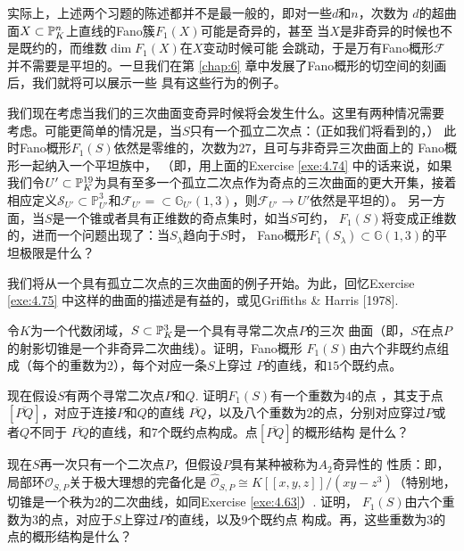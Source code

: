 实际上，上述两个习题的陈述都并不是最一般的，即对一些$d$和$n$，次数为
$d$的超曲面$X\subset \P_K^n$上直线的Fano簇$F_1(X)$可能是奇异的，甚至
当$X$是非奇异的时候也不是既约的，而维数$\dim F_1(X)$在$X$变动时候可能
会跳动，于是万有Fano概形$\mathscr F$并不需要是平坦的。一旦我们在第 
\ref{chap:6} 章中发展了Fano概形的切空间的刻画后，我们就将可以展示一些
具有这些行为的例子。

我们现在考虑当我们的三次曲面变奇异时候将会发生什么。这里有两种情况需要
考虑。可能更简单的情况是，当$S$只有一个孤立二次点：（正如我们将看到的，）
此时Fano概形$F_1(S)$依然是零维的，次数为$27$，且可与非奇异三次曲面上的
Fano概形一起纳入一个平坦族中，
（即，用上面的Exercise \ref{exe:4.74} 中的话来说，如果我们令$U'\subset 
\P_K^{19}$为具有至多一个孤立二次点作为奇点的三次曲面的更大开集，接着
相应定义$\mathscr{S}_{U'}\subset \mathbb{P}_{U'}^{3}$和$\mathscr{F}_{U'}=
\subset \mathbb{G}_{U'}(1,3)$，则$\mathscr{F}_{U'}\to U'$依然是平坦的）。
另一方面，当$S$是一个锥或者具有正维数的奇点集时，如当$S$可约，
$F_1(S)$将变成正维数的，进而一个问题出现了：当$S_\lambda$趋向于$S$时，
Fano概形$F_1(S_\lambda)\subset \mathbb G(1,3)$的平坦极限是什么？

我们将从一个具有孤立二次点的三次曲面的例子开始。为此，回忆Exercise 
\ref{exe:4.75} 中这样的曲面的描述是有益的，或见Griffiths \& Harris 
[1978].

\begin{exe}\label{exe:4.75}
令$K$为一个代数闭域，$S\subset \P_K^3$是一个具有寻常二次点$P$的三次
曲面（即，$S$在点$P$的射影切锥是一个非奇异二次曲线）。证明，Fano概形
$F_1(S)$由六个非既约点组成（每个的重数为$2$），每个对应一条$S$上穿过
$P$的直线，和$15$个既约点。
\end{exe}


\begin{exe}\label{exe:4.76}
现在假设$S$有两个寻常二次点$P$和$Q$. 证明$F_1(S)$有一个重数为$4$的点
，其支于点$[\overline{PQ}]$，对应于连接$P$和$Q$的直线
$\overline{PQ}$，以及八个重数为$2$的点，分别对应穿过$P$或者$Q$不同于
$\overline{PQ}$的直线，和$7$个既约点构成。点$[\overline{PQ}]$的概形结构
是什么？
\end{exe}

\begin{exe}\label{exe:4.77}
现在$S$再一次只有一个二次点$P$，但假设$P$具有某种被称为$A_2$奇异性的
性质：即，局部环$\mathscr O_{S,P}$关于极大理想的完备化是
$\hat{\mathscr O}_{S,P}\cong K[\![x,y,z]\!]/(xy-z^3)$（特别地，
切锥是一个秩为$2$的二次曲线，如同Exercise \ref{exe:4.63}）. 证明，
$F_1(S)$由六个重数为$3$的点，对应于$S$上穿过$P$的直线，以及$9$个既约点
构成。再，这些重数为$3$的点的概形结构是什么？
\end{exe}

